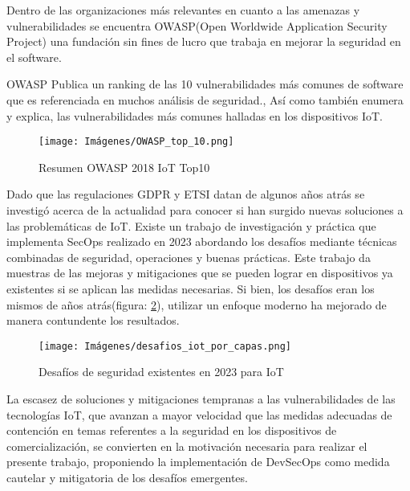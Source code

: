 Dentro de las organizaciones más relevantes en cuanto a las amenazas y vulnerabilidades se encuentra OWASP(Open Worldwide Application Security Project) una fundación sin fines de lucro que trabaja en mejorar la seguridad en el software. 

OWASP Publica un ranking de las 10 vulnerabilidades más comunes de software que es referenciada en muchos análisis de seguridad.\cite{owaspTopTen}, Así como también enumera y explica, las vulnerabilidades más comunes halladas en los dispositivos IoT.\cite{owasp}

\begin{figure}[ht]
    \centering
    \texttt{[image: Imágenes/OWASP\_top\_10.png]}
    \caption{Resumen OWASP 2018 IoT Top10}
    \label{fig:OWASP_2018_IoT_Top10}
\end{figure}

Dado que las regulaciones GDPR y ETSI datan de algunos años atrás se investigó acerca de la actualidad para conocer si han surgido nuevas soluciones a las problemáticas de IoT. Existe un trabajo de investigación y práctica que implementa SecOps realizado en 2023 abordando los desafíos mediante técnicas combinadas de seguridad, operaciones y buenas prácticas. Este trabajo da muestras de las mejoras y mitigaciones que se pueden lograr en dispositivos ya existentes si se aplican las medidas necesarias. Si bien, los desafíos eran los mismos de años atrás(figura: \ref{fig:iot_challenges}), utilizar un enfoque moderno ha mejorado de manera contundente los resultados.\cite{jorgensen2023secops}

\begin{figure}[ht]
    \centering
    \texttt{[image: Imágenes/desafios\_iot\_por\_capas.png]}
    \caption{Desafíos de seguridad existentes en 2023 para IoT}
    \label{fig:iot_challenges}
\end{figure}

La escasez de soluciones y mitigaciones tempranas a las vulnerabilidades de las tecnologías IoT, que avanzan a mayor velocidad que las medidas adecuadas de contención en temas referentes a la seguridad en los dispositivos de comercialización, se convierten en la motivación necesaria para realizar el presente trabajo, proponiendo la implementación de DevSecOps como medida cautelar y mitigatoria de los desafíos emergentes.